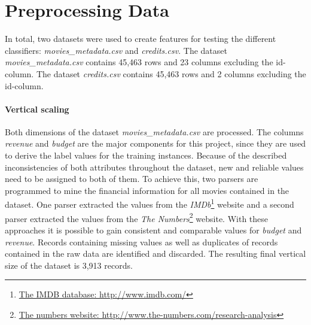 \section{Preprocessing Data}
\label{cha:preprocessing}

In total, two datasets were used to create features for testing the different classifiers:
\textit{movies\_metadata.csv} and \textit{credits.csv}. The dataset \textit{movies\_metadata.csv} contains 45,463 rows and 23 columns excluding the id-column. The dataset \textit{credits.csv} contains 45,463 rows and 2 columns excluding the id-column.

\paragraph{Vertical scaling}
Both dimensions of the dataset \textit{movies\_metadata.csv} are processed. 
The columns \textit{revenue} and \textit{budget} are the major components for this project, since they are used to derive the label values for the training instances. Because of the described inconsistencies of both attributes throughout the dataset, new and reliable values need to be assigned to both of them. To achieve this, two parsers are programmed to mine the financial information for all movies contained in the dataset. One parser extracted the values from the \textit{IMDb}\footnote{\hyperref{http://www.imdb.com/}{external_sources}{ref:IMDB}{The IMDB database: http://www.imdb.com/}} website and a second parser extracted the values from the \textit{The Numbers}\footnote{\hyperref{http://www.the-numbers.com/research-analysis}{external_sources}{ref:numbers}{The numbers website: http://www.the-numbers.com/research-analysis}} website. With these approaches it is possible to gain consistent and comparable values for \textit{budget} and \textit{revenue}. Records containing missing values as well as duplicates of records contained in the raw data are identified and discarded. The resulting final vertical size of the dataset is 3,913 records.

 

